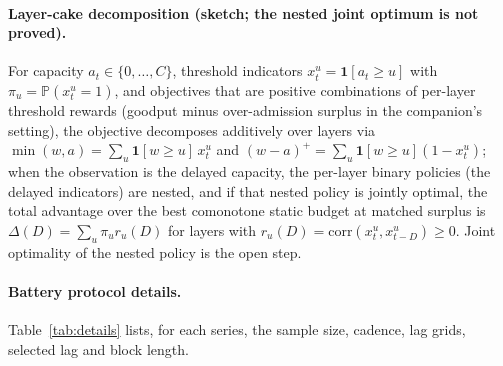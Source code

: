 \documentclass[acmsmall,screen,review,anonymous]{acmart}
\begin{document}
\paragraph{Layer-cake decomposition (sketch; the nested joint optimum is not proved).}
For capacity $a_t\in\{0,\dots,C\}$, threshold indicators
$x^u_t=\mathbf 1[a_t\ge u]$ with $\pi_u=\mathbb P(x^u_t{=}1)$, and
objectives that are positive combinations of per-layer threshold rewards
(goodput minus over-admission surplus in the companion's setting), the
objective decomposes additively over layers via
$\min(w,a)=\sum_u\mathbf 1[w\ge u]\,x^u_t$ and
$(w-a)^+=\sum_u\mathbf 1[w\ge u](1-x^u_t)$; when the observation is the delayed capacity, the per-layer binary policies
(the delayed indicators) are nested, and if that nested policy is jointly
optimal, the total advantage over the best comonotone static budget at
matched surplus is $\Delta(D)=\sum_u\pi_u r_u(D)$ for layers with
$r_u(D)=\mathrm{corr}(x^u_t,x^u_{t-D})\ge0$. Joint optimality of the nested
policy is the open step.

\paragraph{Battery protocol details.} Table~\ref{tab:details} lists, for each series, the sample size, cadence, lag grids, selected lag and block length.
\end{document}
